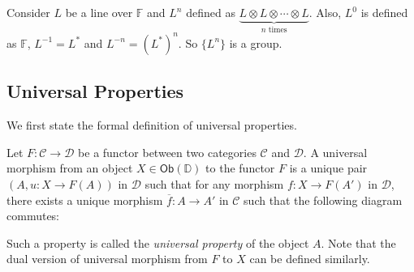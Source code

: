 \documentclass[
	11pt, %
	fleqn, %
	a4paper, %
]{LegrandOrangeBook}
\renewcommand{\bar}[1]{\overline{#1}} %
\newcommand{\F}{\mathbb{F}} %
\newcommand{\C}{\mathcal{C}} %
\newcommand{\D}{\mathcal{D}} %
\newcommand{\Ob}[1]{\mathsf{Ob}(#1)} %
\begin{document}
Consider $L$ be a line over $\F$ and $L^n$ defined as $\underbrace{L \otimes L \otimes \cdots \otimes L}_{n \text{ times}}$. Also, $L^0$ is defined as $\F$, $L^{-1} = L^*$ and $L^{-n} = (L^*)^n$. So $\{ L^n \}$ is a group. 





\begin{appendices}

\renewcommand{\chaptername}{Appendix} %


\chapter{Universal Properties}

We first state the formal definition of universal properties.

\begin{definition}
    Let $F : \C \to \D$ be a functor between two categories $\C$ and $\D$. A universal morphism from an object $X \in \Ob{\mathbb{D}}$ to the functor $F$ is a unique pair $(A, u : X \to F(A))$ in $\D$ such that for any morphism $f : X \to F(A')$ in $\D$, there exists a unique morphism $\bar{f} : A \to A'$ in $\C$ such that the following diagram commutes:
    \begin{center}
    \end{center}
    Such a property is called the \emph{universal property} of the object $A$. Note that the dual version of universal morphism from $F$ to $X$ can be defined similarly.
\end{definition}


\end{appendices}
\end{document}
